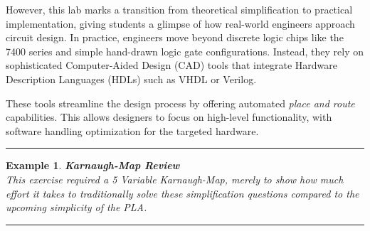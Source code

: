 \documentclass[12pt]{article}
\newtheorem{example}{Example}
\newenvironment{examp}
{
	\vspace{.5cm}
	\hrule
\begin{example}\upshape}
	{\hrule
		\vspace{0.5cm}
\end{example}}
\begin{document}
However, this lab marks a transition from theoretical simplification to practical implementation, giving students a glimpse of how real-world engineers approach circuit design. In practice, engineers move beyond discrete logic chips like the 7400 series and simple hand-drawn logic gate configurations. Instead, they rely on sophisticated Computer-Aided Design (CAD) tools that integrate Hardware Description Languages (HDLs) such as VHDL or Verilog.

These tools streamline the design process by offering automated \textit{place and route} capabilities. This allows designers to focus on high-level functionality, with software handling optimization for the targeted hardware.
\begin{examp}
\vspace{.5mm}
\textbf{Karnaugh-Map Review}\\
This exercise required a 5 Variable Karnaugh-Map, merely to show how much effort
it takes to traditionally solve these simplification questions compared to the
upcoming simplicity of the PLA.


\end{examp}
\end{document}
